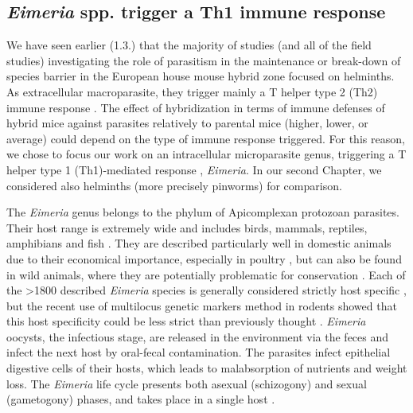 \subsection{\textit{Eimeria} spp. trigger a Th1 immune response}
We have seen earlier (1.3.) that the majority of studies (and all of the field studies) investigating the role of parasitism in the maintenance or break-down of species barrier in the European house mouse hybrid zone focused on helminths. As extracellular macroparasite, they trigger mainly a T helper type 2 (Th2) immune response \citep{sher_regulation_1992}. The effect of hybridization in terms of immune defenses of hybrid mice against parasites relatively to parental mice (higher, lower, or average) could depend on the type of immune response triggered. For this reason, we chose to focus our work on an intracellular microparasite genus, triggering a T helper type 1 (Th1)-mediated response \citep{sher_regulation_1992}, \textit{Eimeria}. In our second Chapter, we considered also helminths (more precisely pinworms) for comparison.
\par
The \textit{Eimeria} genus belongs to the phylum of Apicomplexan protozoan parasites. Their host range is extremely wide and includes birds, mammals, reptiles, amphibians and fish \citep{chapman_chapter_2013}. They are described particularly well in domestic animals due to their economical importance, especially in poultry \citep{blake_securing_2014}, but can also be found in wild animals, where they are potentially problematic for conservation \parencite{jeanes_two_2013, knowles_stability_2013, matsubayashi_molecular_2018}. Each of the >1800 described \textit{Eimeria} species is generally considered strictly host specific \citep{duszynski_eimeria_2011}, but the recent use of multilocus genetic markers method in rodents showed that this host specificity could be less strict than previously thought \citep{jarquin-diaz_generalist_2020}. \textit{Eimeria} oocysts, the infectious stage, are released in the environment via the feces and infect the next host by oral-fecal contamination. The parasites infect epithelial digestive cells of their hosts, which leads to malabsorption of nutrients and weight loss. The \textit{Eimeria} life cycle presents both asexual (schizogony) and sexual (gametogony) phases, and takes place in a single host \citep{burrell_life_2019}.
\par
